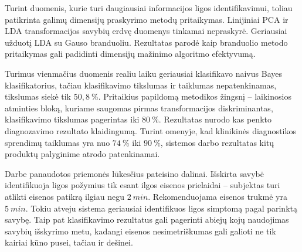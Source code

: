 \documentclass[a4paper,11pt,twocolumn]{IEEEtran}
\begin{document}
Turint duomenis, kurie turi daugiausiai informacijos ligos identifikavimui, toliau patikrinta galimų dimensijų praskyrimo metodų pritaikymas. Linijiniai PCA ir LDA transformacijos savybių erdvę duomenys tinkamai nepraskyrė. Geriausiai užduotį LDA su Gauso branduoliu. Rezultatas parodė kaip branduolio metodo pritaikymas gali padidinti dimensijų mažinimo algoritmo efektyvumą.

	Turimus vienmačius duomenis realiu laiku geriausiai klasifikavo naivus Bayes klasifikatorius, tačiau klasifikavimo tikslumas ir taiklumas nepatenkinamas, tikslumas siekė tik $50,8~\%$. Pritaikius papildomą metodikos žingsnį -- laikinosios atminties bloką, kuriame saugomas pirmas transformacijos diskriminantas, klasifikavimo tikslumas pagerintas iki $80~\%$. Rezultatas nurodo kas penkto diagnozavimo rezultato klaidingumą. Turint omenyje, kad klinikinės diagnostikos sprendimų taiklumas yra nuo $74~\%$ iki $90~\%$, sistemos darbo rezultatas kitų produktų palyginime atrodo patenkinamai.
	
	Darbe panaudotos priemonės lūkesčius pateisino dalinai. Išskirta savybė identifikuoja ligos požymius tik esant ilgos eisenos prielaidai -- subjektas turi atlikti eisenos patikrą ilgiau negu $2~min$. Rekomenduojama eisenos trukmė yra $5~min$. Tokiu atveju sistema geriausiai identifikuos ligos simptomą pagal parinktą savybę. Taip pat klasifikavimo rezultatus gali pagerinti abiejų kojų naudojimas savybių išskyrimo metu, kadangi eisenos nesimetriškumas gali galioti ne tik kairiai kūno pusei, tačiau ir dešinei.
\end{document}
